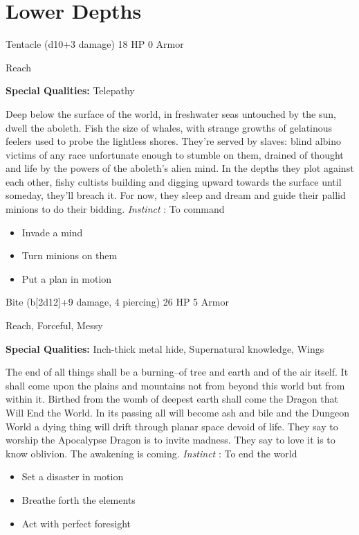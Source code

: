 \section{Lower Depths}




 Tentacle (d10+3 damage) 18 HP 0 Armor


 Reach


 \textbf{Special Qualities:}
 Telepathy


 Deep below the surface of the world, in freshwater seas untouched by the sun, dwell the aboleth. Fish the size of whales, with strange growths of gelatinous feelers used to probe the lightless shores. They're served by slaves: blind albino victims of any race unfortunate enough to stumble on them, drained of thought and life by the powers of the aboleth's alien mind. In the depths they plot against each other, fishy cultists building and digging upward towards the surface until someday, they'll breach it. For now, they sleep and dream and guide their pallid minions to do their bidding. \emph{Instinct}
: To command
\begin{itemize}
\item Invade a mind
\item Turn minions on them
\item Put a plan in motion

\end{itemize}




 Bite (b[2d12]+9 damage, 4 piercing) 26 HP 5 Armor


 Reach, Forceful, Messy


 \textbf{Special Qualities:}
 Inch-thick metal hide, Supernatural knowledge, Wings


 The end of all things shall be a burning--of tree and earth and of the air itself. It shall come upon the plains and mountains not from beyond this world but from within it. Birthed from the womb of deepest earth shall come the Dragon that Will End the World. In its passing all will become ash and bile and the Dungeon World a dying thing will drift through planar space devoid of life. They say to worship the Apocalypse Dragon is to invite madness. They say to love it is to know oblivion. The awakening is coming. \emph{Instinct}
: To end the world
\begin{itemize}
\item Set a disaster in motion
\item Breathe forth the elements
\item Act with perfect foresight

\end{itemize}


